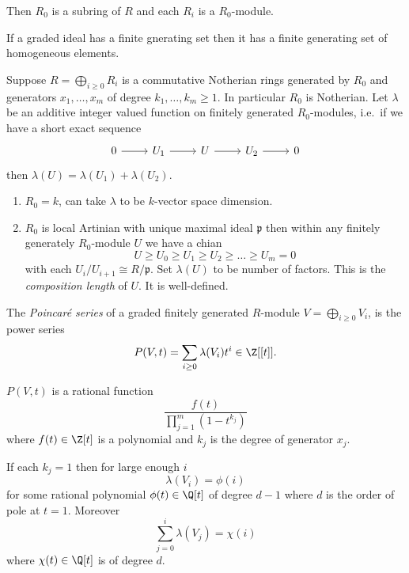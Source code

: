 \documentclass[a4paper]{article}
\begin{document}
Then \(R_0\) is a subring of \(R\) and each \(R_i\) is a \(R_0\)-module.

\begin{note}
  If a graded ideal has a finite gnerating set then it has a finite generating set of homogeneous elements.
\end{note}

Suppose \(R = \bigoplus_{i \geq 0} R_i\) is a commutative Notherian rings generated by \(R_0\) and generators \(x_1, \dots, x_m\) of degree \(k_1, \dots, k_m \geq 1\). In particular \(R_0\) is Notherian. Let \(\lambda\) be an additive integer valued function on finitely generated \(R_0\)-modules, i.e.\ if we have a short exact sequence
\[
  \begin{tikzcd}
    0 \ar[r] & U_1 \ar[r] & U \ar[r] & U_2 \ar[r] & 0
  \end{tikzcd}
\]
then \(\lambda(U) = \lambda(U_1) + \lambda(U_2)\).

\begin{eg}\leavevmode
  \begin{enumerate}
  \item \(R_0 = k\), can take \(\lambda\) to be \(k\)-vector space dimension.
  \item \(R_0\) is local Artinian with unique maximal ideal \(\mathfrak p\) then within any finitely generately \(R_0\)-module \(U\) we have a chian
    \[
      U \geq U_0 \geq U_1 \geq U_2 \geq \dots \geq U_m = 0
    \]
    with each \(U_i/U_{i + 1} \cong R/\mathfrak p\). Set \(\lambda(U)\) to be number of factors. This is the \emph{composition length} of \(U\). It is well-defined.
  \end{enumerate}
\end{eg}

\begin{definition}
  The \emph{Poincaré series} of a graded finitely generated \(R\)-module \(V = \bigoplus_{i \geq 0} V_i\), is the power series
  \[
    P(V, t) = \sum_{i \geq 0} \lambda(V_i) t^i \in \Z[[t]].
  \]
\end{definition}

\begin{theorem}
  \label{thm:Hilbert-Serre}
  \(P(V, t)\) is a rational function
  \[
    \frac{f(t)}{\prod_{j =1}^m (1 - t^{k_j})}
  \]
  where \(f(t) \in \Z[t]\) is a polynomial and \(k_j\) is the degree of generator \(x_j\).
\end{theorem}

\begin{corollary}
  If each \(k_j = 1\) then for large enough \(i\)
  \[
    \lambda(V_i) = \phi(i)
  \]
  for some rational polynomial \(\phi(t) \in \Q[t]\) of degree \(d - 1\) where \(d\) is the order of pole at \(t = 1\). Moreover
  \[
    \sum_{j = 0}^i \lambda(V_j) = \chi(i)
  \]
  where \(\chi(t) \in \Q[t]\) is of degree \(d\).
\end{corollary}
\end{document}
